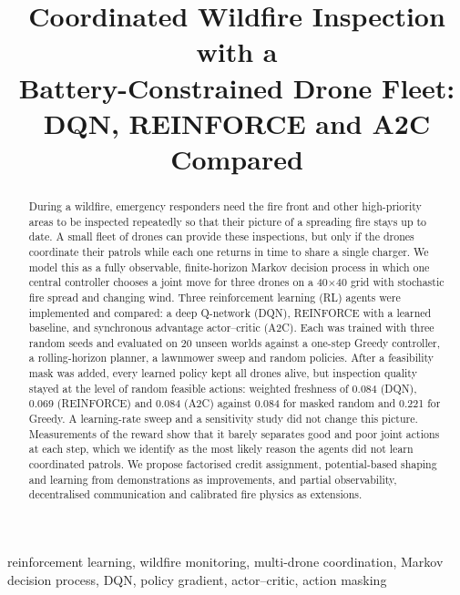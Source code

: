 \documentclass[conference,a4paper]{IEEEtran}
\begin{document}
\title{Coordinated Wildfire Inspection with a\\Battery-Constrained Drone Fleet:\\DQN, REINFORCE and A2C Compared}

\author{
\and
{}
\and
{}
}

\maketitle

\begin{abstract}
During a wildfire, emergency responders need the fire front and other high-priority areas to
be inspected repeatedly so that their picture of a spreading fire stays up to date. A small
fleet of drones can provide these inspections, but only if the drones coordinate their patrols
while each one returns in time to share a single charger. We model this as a fully observable, finite-horizon Markov decision process in which one central
controller chooses a joint move for three drones on a 40$\times$40 grid with stochastic fire
spread and changing wind. Three reinforcement learning (RL) agents were implemented and
compared: a deep Q-network (DQN), REINFORCE with a learned baseline, and synchronous advantage
actor--critic (A2C). Each was trained with three random seeds and evaluated on 20 unseen
worlds against a one-step Greedy controller, a rolling-horizon planner, a lawnmower sweep and
random policies. After a feasibility mask was added, every learned policy kept all drones
alive, but inspection quality stayed at the level of random feasible actions: weighted
freshness of 0.084 (DQN), 0.069 (REINFORCE) and 0.084 (A2C) against 0.084 for masked random
and 0.221 for Greedy. A learning-rate sweep and a sensitivity study did not change this
picture. Measurements of the reward show that it barely separates good and poor joint actions
at each step, which we identify as the most likely reason the agents did not learn coordinated
patrols. We propose factorised credit assignment, potential-based shaping and
learning from demonstrations as improvements, and partial observability, decentralised
communication and calibrated fire physics as extensions.
\end{abstract}

\begin{IEEEkeywords}
reinforcement learning, wildfire monitoring, multi-drone coordination, Markov decision
process, DQN, policy gradient, actor--critic, action masking
\end{IEEEkeywords}


\end{document}
